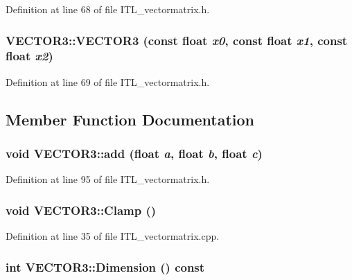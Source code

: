 Definition at line 68 of file ITL\_\-vectormatrix.h.

\hypertarget{classVECTOR3_a36d21006a60aab59533ad9ef1f0dbec0}{
\subsubsection[{VECTOR3}]{\setlength{\rightskip}{0pt plus 5cm}VECTOR3::VECTOR3 (const float {\em x0}, \/  const float {\em x1}, \/  const float {\em x2})}}
\label{classVECTOR3_a36d21006a60aab59533ad9ef1f0dbec0}


Definition at line 69 of file ITL\_\-vectormatrix.h.



\subsection{Member Function Documentation}
\hypertarget{classVECTOR3_aa5db49d73f2676c01fb2e11c5ead2f31}{
\subsubsection[{add}]{\setlength{\rightskip}{0pt plus 5cm}void VECTOR3::add (float {\em a}, \/  float {\em b}, \/  float {\em c})}}
\label{classVECTOR3_aa5db49d73f2676c01fb2e11c5ead2f31}


Definition at line 95 of file ITL\_\-vectormatrix.h.

\hypertarget{classVECTOR3_a5ff1e83937b7cb26817fcb880dd1775e}{
\subsubsection[{Clamp}]{\setlength{\rightskip}{0pt plus 5cm}void VECTOR3::Clamp ()}}
\label{classVECTOR3_a5ff1e83937b7cb26817fcb880dd1775e}


Definition at line 35 of file ITL\_\-vectormatrix.cpp.

\hypertarget{classVECTOR3_a0f24d4dfcad2cf3bb11caa5a8f3bb758}{
\subsubsection[{Dimension}]{\setlength{\rightskip}{0pt plus 5cm}int VECTOR3::Dimension () const}}
\label{classVECTOR3_a0f24d4dfcad2cf3bb11caa5a8f3bb758}


